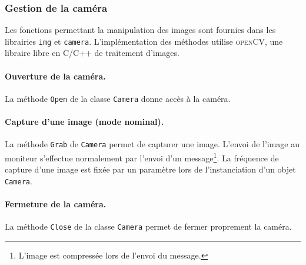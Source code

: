 \subsubsection{Gestion de la caméra}

Les fonctions permettant la manipulation des images sont fournies dans les librairies {\tt img} et {\tt camera}. L'implémentation des méthodes utilise \textsc{openCV}, une libraire libre en C/C++ de traitement d'images.

\paragraph{Ouverture de la caméra.} La méthode {\tt Open} de la classe {\tt Camera} donne accès à la caméra.\\


\paragraph{Capture d'une image (mode nominal).} La méthode {\tt Grab} de {\tt Camera} permet de capturer une image. L'envoi de l'image au moniteur s'effectue normalement par l'envoi d'un message\footnote{L'image est compressée lors de l'envoi du message.}. La fréquence de capture d'une image est fixée par un paramètre lors de l'instanciation d'un objet {\tt Camera}.\\


\paragraph{Fermeture de la caméra.} La méthode {\tt Close} de la classe {\tt Camera} permet de fermer proprement la caméra.\\



